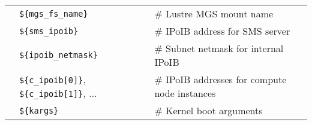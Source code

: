 \vspace*{0.2cm}
\vspace*{0.1cm}

\begin{tabular}{@{}>{\textbullet}l p{5.5cm} l}
& \texttt{\$\{mgs\_fs\_name\}} & {\small \# Lustre MGS mount name} \\
& \texttt{\$\{sms\_ipoib\}} & {\small \# IPoIB address for SMS server} \\
& \texttt{\$\{ipoib\_netmask\}} & {\small \# Subnet netmask for internal IPoIB} \\
& \texttt{\$\{c\_ipoib[0]\}}, \texttt{\$\{c\_ipoib[1]\}}, ... & {\small \# IPoIB addresses for compute node instances} \\
& \texttt{\$\{kargs\}} & {\small \# Kernel boot arguments} \\  
\end{tabular}


